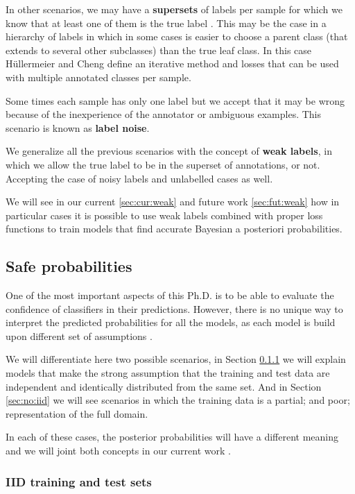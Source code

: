 \documentclass[a4paper, 12pt]{article}
\begin{document}
In other scenarios, we may have a \textbf{supersets} of labels per sample for which we know that at least one of them is the true label \cite{Hullermeier2015, Cour2011}.
This may be the case in a hierarchy of labels in which in some cases is easier to choose a parent class (that extends to several other subclasses) than the true leaf class.
In this case Hüllermeier and Cheng \cite{Hullermeier2015, Cour2011} define an iterative method and losses that can be used with multiple annotated classes per sample.

Some times each sample has only one label but we accept that it may be wrong because of the inexperience of the annotator or ambiguous examples.
This scenario is known as \textbf{label noise}.

We generalize all the previous scenarios with the concept of \textbf{weak labels}, in which we allow the true label to be in the superset of annotations, or not.
Accepting the case of noisy labels and unlabelled cases as well.

We will see in our current \ref{sec:cur:weak} and future work \ref{sec:fut:weak} how in particular cases it is possible to use weak labels combined with proper loss functions to train models that find accurate Bayesian a posteriori probabilities.

\subsection{Safe probabilities}
\label{sec:unknown}

One of the most important aspects of this Ph.D. is to be able to evaluate the confidence of classifiers in their predictions.
However, there is no unique way to interpret the predicted probabilities for all the models, as each model is build upon different set of assumptions \cite{Grunwald2017}.

We will differentiate here two possible scenarios, in Section \ref{sec:iid} we will explain models that make the strong assumption that the training and test data are independent and identically distributed from the same set.
And in Section \ref{sec:no:iid} we will see scenarios in which the training data is a partial; and poor; representation of the full domain.

In each of these cases, the posterior probabilities will have a different meaning and we will joint both concepts in our current work \cite{perello2016}.

\subsubsection{IID training and test sets}
\label{sec:iid}
\end{document}
